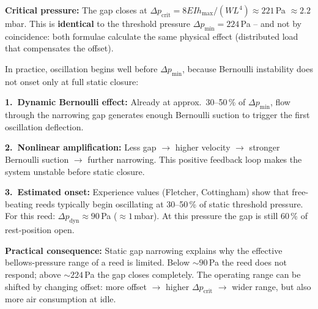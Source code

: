 \documentclass[11pt,a4paper]{article}
\begin{document}
\begin{table}[H]
\centering\small
{}
\caption{Static gap narrowing under bellows pressure (K6). Gap closes above $\Delta p > 224$\,Pa.}
\end{table}

\begin{keybox}
\textbf{Critical pressure:} The gap closes at $\Delta p_\text{crit} = 8EIh_\text{max}/(WL^4) \approx 221$\,Pa $\approx 2.2$\,mbar. This is \textbf{identical} to the threshold pressure $\Delta p_\text{min} = 224$\,Pa -- and not by coincidence: both formulae calculate the same physical effect (distributed load that compensates the offset).
\end{keybox}

In practice, oscillation begins well before $\Delta p_\text{min}$, because Bernoulli instability does not onset only at full static closure:

\textbf{1.\ Dynamic Bernoulli effect:} Already at approx.\ 30--50\,\% of $\Delta p_\text{min}$, flow through the narrowing gap generates enough Bernoulli suction to trigger the first oscillation deflection.

\textbf{2.\ Nonlinear amplification:} Less gap $\to$ higher velocity $\to$ stronger Bernoulli suction $\to$ further narrowing. This positive feedback loop makes the system unstable before static closure.

\textbf{3.\ Estimated onset:} Experience values (Fletcher, Cottingham) show that free-beating reeds typically begin oscillating at 30--50\,\% of static threshold pressure. For this reed: $\Delta p_\text{dyn} \approx 90$\,Pa ($\approx 1$\,mbar). At this pressure the gap is still 60\,\% of rest-position open.

\begin{warnbox}
\textbf{Practical consequence:} Static gap narrowing explains why the effective bellows-pressure range of a reed is limited. Below $\sim 90$\,Pa the reed does not respond; above $\sim 224$\,Pa the gap closes completely. The operating range can be shifted by changing offset: more offset $\to$ higher $\Delta p_\text{crit}$ $\to$ wider range, but also more air consumption at idle.
\end{warnbox}
\end{document}
